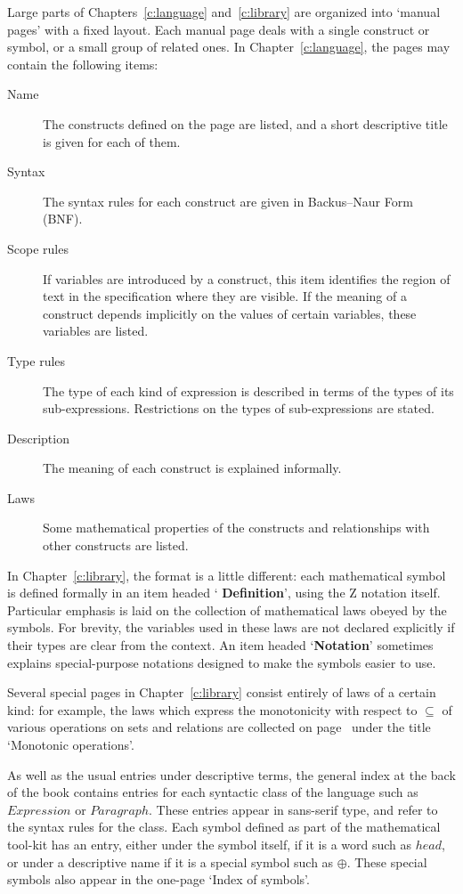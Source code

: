 Large parts of Chapters~\ref{c:language} and~\ref{c:library} are
organized into `manual pages' with a fixed layout.  Each manual page
deals with a single construct or symbol, or a small group of related
ones.  In Chapter~\ref{c:language}, the pages may contain the
following items:
\begin{description}
\item[Name] 
	The constructs defined on the page are listed, and a short
	descriptive title is given for each of them.
\item[Syntax] 
	The syntax rules for each construct are given in Backus--Naur
	Form (BNF).
\item[Scope rules]
	If variables are introduced by a construct, this item
	identifies the region of text in the specification where they
	are visible.  If the meaning of a construct depends implicitly
	on the values of certain variables, these variables are listed.
\item[Type rules]
	The type of each kind of expression is described in terms of
	the types of its sub-expressions.  Restrictions on the types
	of sub-expressions are stated.
\item[Description]
	The meaning of each construct is explained informally.
\item[Laws]
	Some mathematical properties of the constructs and
	relationships with other constructs are listed.
\end{description}
In Chapter~\ref{c:library}, the format is a little different: each
mathematical symbol is defined formally in an item headed `{\bf
Definition}', using the Z notation itself. Particular emphasis is laid
on the collection of mathematical laws obeyed by
the symbols. For brevity, the variables used in these laws are not
declared explicitly if their types are clear from the context. An item
headed `{\bf Notation}' sometimes explains special-purpose notations
designed to make the symbols easier to use.

Several special pages in Chapter~\ref{c:library} consist entirely of
laws of a certain kind: for example, the laws which express the
monotonicity with respect to $\subseteq$ of various operations on sets
and relations are collected on page~\pageref{p:mono} under the title
`Monotonic operations'.

As well as the usual entries under descriptive terms, the general
index at the back of the book contains entries for each syntactic
class of the language such as \(Expression\) or \(Paragraph\). These
entries appear in sans-serif type, and refer to the syntax rules for
the class.  Each symbol defined as part of the mathematical tool-kit
has an entry, either under the symbol itself, if it is a word such as
$head$, or under a descriptive name if it is a special symbol such as
$\oplus$.  These special symbols also appear in the one-page `Index of
symbols'.

